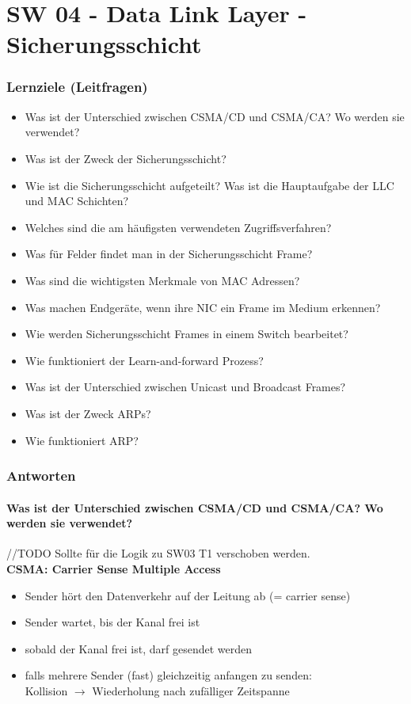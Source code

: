 \part{SW 04 - Data Link Layer - Sicherungsschicht}\label{part:sw04}
\section{Lernziele (Leitfragen)}
\begin{itemize}
    \item Was ist der Unterschied zwischen CSMA/CD und CSMA/CA? Wo werden sie verwendet?
    \item Was ist der Zweck der Sicherungsschicht?
    \item Wie ist die Sicherungsschicht aufgeteilt? Was ist die Hauptaufgabe der LLC und MAC Schichten?
    \item Welches sind die am häufigsten verwendeten Zugriffsverfahren?
    \item Was für Felder findet man in der Sicherungsschicht Frame?
    \item Was sind die wichtigsten Merkmale von MAC Adressen?
    \item Was machen Endgeräte, wenn ihre NIC ein Frame im Medium erkennen?
    \item Wie werden Sicherungsschicht Frames in einem Switch bearbeitet?
    \item Wie funktioniert der \flqq Learn-and-forward\frqq{} Prozess?
    \item Was ist der Unterschied zwischen \flqq Unicast\frqq{} und \flqq Broadcast\frqq{} Frames?
    \item Was ist der Zweck ARPs?
    \item Wie funktioniert ARP?
\end{itemize}

\section{Antworten}
\subsection*{Was ist der Unterschied zwischen CSMA/CD und CSMA/CA? Wo werden sie verwendet?}\label{sub:csma}
//TODO Sollte für die Logik zu SW03 T1 verschoben werden.\\

\textbf{CSMA: Carrier Sense Multiple Access}
\begin{itemize}
    \item Sender hört den Datenverkehr auf der Leitung ab (= carrier sense)
    \item Sender wartet, bis der Kanal frei ist
    \item sobald der Kanal frei ist, darf gesendet werden
    \item falls mehrere Sender (fast) gleichzeitig anfangen zu senden:\\Kollision $\rightarrow$ Wiederholung nach zufälliger Zeitspanne
\end{itemize}\,\\

